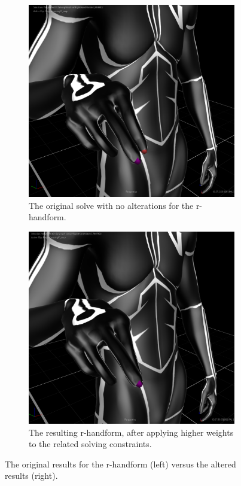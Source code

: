 \documentclass{uva-inf-article}
\begin{document}
\begin{figure}[hbt!]
\begin{subfigure}{.5\textwidth}
  \centering
  \includegraphics[width=.8\linewidth]{imgs/r-handform/noR.png}
  \caption{The original solve with no alterations for the r-handform.}
  \label{fig:comparisonR:sfig1}
\end{subfigure}%
\begin{subfigure}{.5\textwidth}
  \centering
  \includegraphics[width=.8\linewidth]{imgs/r-handform/finalR.png}
  \caption{The resulting r-handform, after applying higher weights to the related solving constraints.}
  \label{fig:comparisonR:sfig2}
\end{subfigure}
\caption{The original results for the r-handform (left) versus the altered results (right).}
\label{fig:comparisonR}
\end{figure}
\end{document}
